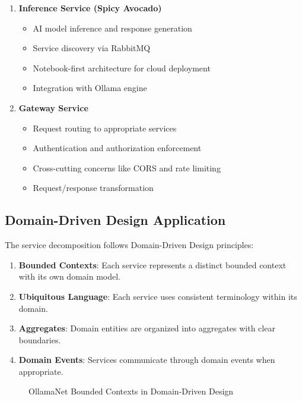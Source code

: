 \begin{enumerate}
   \item \textbf{Inference Service (Spicy Avocado)}
   \begin{itemize}
      \item AI model inference and response generation
      \item Service discovery via RabbitMQ
      \item Notebook-first architecture for cloud deployment
      \item Integration with Ollama engine
   \end{itemize}

   \item \textbf{Gateway Service}
   \begin{itemize}
      \item Request routing to appropriate services
      \item Authentication and authorization enforcement
      \item Cross-cutting concerns like CORS and rate limiting
      \item Request/response transformation
   \end{itemize}
\end{enumerate}

\subsection{Domain-Driven Design Application}

The service decomposition follows Domain-Driven Design principles:

\begin{enumerate}
   \item \textbf{Bounded Contexts}: Each service represents a distinct bounded context with its own domain model.
   \item \textbf{Ubiquitous Language}: Each service uses consistent terminology within its domain.
   \item \textbf{Aggregates}: Domain entities are organized into aggregates with clear boundaries.
   \item \textbf{Domain Events}: Services communicate through domain events when appropriate.
\end{enumerate}

\begin{figure}
    \centering
    \caption{OllamaNet Bounded Contexts in Domain-Driven Design}
    \label{fig:domain-contexts}
\end{figure}

